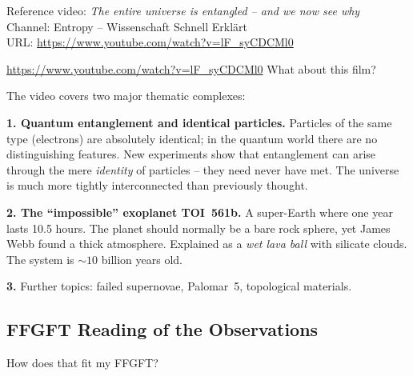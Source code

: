 \begin{videobox}
Reference video: \emph{The entire universe is entangled -- and we now see why} \\
Channel: Entropy -- Wissenschaft Schnell Erklärt \\
URL: \url{https://www.youtube.com/watch?v=lF_syCDCMl0}
\end{videobox}

\begin{userbox}
\url{https://www.youtube.com/watch?v=lF_syCDCMl0} \quad What about this film?
\end{userbox}

\begin{geminibox}
The video covers two major thematic complexes:

\textbf{1. Quantum entanglement and identical particles.} Particles of the same type (electrons) are absolutely identical; in the quantum world there are no distinguishing features. New experiments show that entanglement can arise through the mere \emph{identity} of particles -- they need never have met. The universe is much more tightly interconnected than previously thought.

\textbf{2. The ``impossible'' exoplanet TOI~561b.} A super-Earth where one year lasts 10.5 hours. The planet should normally be a bare rock sphere, yet James Webb found a thick atmosphere. Explained as a \emph{wet lava ball} with silicate clouds. The system is $\sim 10$ billion years old.

\textbf{3.} Further topics: failed supernovae, Palomar~5, topological materials.
\end{geminibox}

\subsection{FFGFT Reading of the Observations}

\begin{userbox}
How does that fit my FFGFT?
\end{userbox}

